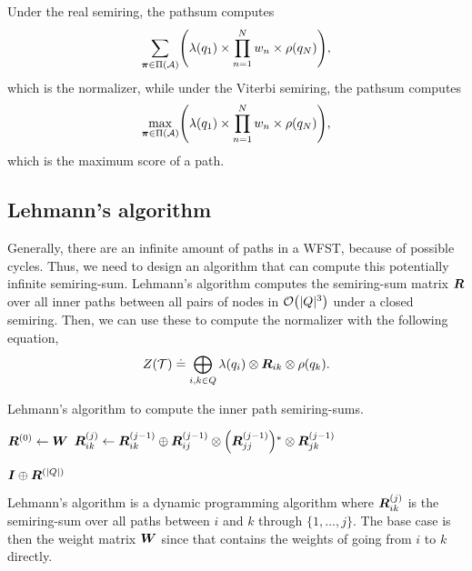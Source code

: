 Under the real semiring, the pathsum computes \[
    \sum_{\bm{\pi}\in\Pi(\mathcal{A})} \lft( \lambda(q_1) \times \prod_{n=1}^N w_n \times \rho(q_N) \rgt)
    ,\]
which is the normalizer, while under the Viterbi semiring, the pathsum computes
\[
    \max_{\bm{\pi}\in\Pi(\mathcal{A})} \lft( \lambda(q_1) \times \prod_{n=1}^N w_n \times \rho(q_N) \rgt)
    ,\]
which is the maximum score of a path.

\subsection{Lehmann's algorithm}

Generally, there are an infinite amount of paths in a WFST, because of possible
cycles. Thus, we need to design an algorithm that can compute this potentially
infinite semiring-sum. Lehmann's algorithm \citep{lehmann1977algebraic}
computes the semiring-sum matrix $\bm{R}$ over all inner paths between all
pairs of nodes in $\bigo{|Q|^3}$ under a closed semiring. Then, we can use
these to compute the normalizer with the following equation, \[
    Z(\mathcal{T}) \doteq \bigoplus_{i,k \in Q} \lambda(q_i) \otimes \bm{R}_{ik} \otimes \rho(q_k)
    .\]

\begin{algorithm}
    \caption{Lehmann's algorithm to compute the inner path semiring-sums.}
    \label{alg:lehmann}

    \begin{algorithmic}[1]
        \State $\bm{R}^{(0)} \gets \bm{W}$
        \State $\mat{R}_{ik}^{(j)} \gets \mat{R}_{ik}^{(j-1)} \oplus \mat{R}_{ij}^{(j-1)} \otimes \lft( \mat{R}_{jj}^{(j-1)} \rgt)^* \otimes \mat{R}_{jk}^{(j-1)}$
        \EndFor
        \EndFor
        \EndFor

        \State \Return $\bm{I} \oplus \bm{R}^{(|Q|)}$
        \EndFunction
    \end{algorithmic}
\end{algorithm}

Lehmann's algorithm is a dynamic programming algorithm where
$\bm{R}_{ik}^{(j)}$ is the semiring-sum over all paths between $i$ and $k$
through $\{ 1,\ldots, j \}$. The base case is then the weight matrix $\bm{W}$
since that contains the weights of going from $i$ to $k$ directly.

